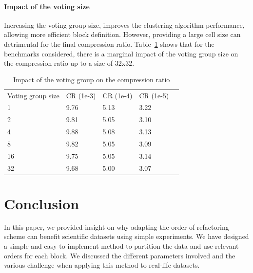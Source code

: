 \documentclass[conference]{IEEEtran}
\theoremstyle{remark}
\begin{document}
\paragraph{Impact of the voting size}
Increasing the voting group size, improves the clustering algorithm performance, allowing more efficient block definition.
However, providing a large cell size can detrimental for the final compression ratio.
Table~\ref{tab:cell_size} shows that for the benchmarks considered, there is a marginal impact of the voting group size on the compression ratio up to a size of 32x32.

\begin{table}[]
\caption{Impact of the voting group on the compression ratio}
\label{tab:cell_size}
\begin{tabular}{lllll}
\cline{1-4}
\multicolumn{1}{|l|}{Voting group size} & \multicolumn{1}{l|}{CR (1e-3)} & \multicolumn{1}{l|}{CR (1e-4)} & \multicolumn{1}{l|}{CR (1e-5)} &  \\ \cline{1-4}
1 & 9.76 & 5.13 & 3.22 &  \\
\cellcolor[HTML]{EFEFEF}2 & \cellcolor[HTML]{EFEFEF}9.81 & \cellcolor[HTML]{EFEFEF}5.05 & \cellcolor[HTML]{EFEFEF}3.10 &  \\
4 & 9.88 & 5.08 & 3.13 &  \\
\cellcolor[HTML]{EFEFEF}8 & \cellcolor[HTML]{EFEFEF}9.82 & \cellcolor[HTML]{EFEFEF}5.05 & \cellcolor[HTML]{EFEFEF}3.09 &  \\
16 & 9.75 & 5.05 & 3.14 &  \\
\cellcolor[HTML]{EFEFEF}32 & \cellcolor[HTML]{EFEFEF}9.68 & \cellcolor[HTML]{EFEFEF}5.00 & \cellcolor[HTML]{EFEFEF}3.07 & 
\end{tabular}
\end{table}
    


\section{Conclusion}

In this paper, we provided insight on why adapting the order of refactoring scheme can benefit scientific datasets using simple experiments.
We have designed a simple and easy to implement method to partition the data and use relevant orders for each block. We discussed the different parameters involved and the various challenge when applying this method to real-life datasets.
\end{document}
